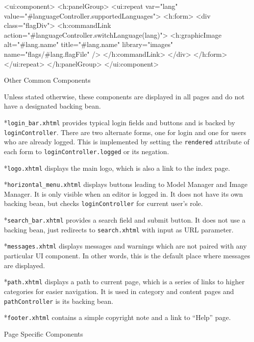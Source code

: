 \begtt

<ui:component>
  <h:panelGroup>
    <ui:repeat var="lang"
        value="#{languageController.supportedLanguages}">                    
      <h:form>
        <div class="flagDiv">
          <h:commandLink
              action="#{languageController.switchLanguage(lang)}">
            <h:graphicImage
                alt="#{lang.name}" title="#{lang.name}"
                library="images" name="flags/#{lang.flagFile}" />
          </h:commandLink>
        </div>
      </h:form>
    </ui:repeat>
  </h:panelGroup>
</ui:component>

\endtt

\secc Other Common Components

Unless stated otherwise, these components are displayed in all pages and do not have a designated backing bean.

\begitems

*{\tt login\_bar.xhtml} provides typical login fields and buttons and is backed by {\tt loginController}. There are two alternate forms, one for login and one for users who are already logged. This is implemented by setting the {\tt rendered} attribute of each form to {\tt loginController.logged} or its negation.

*{\tt logo.xhtml} displays the main logo, which is also a link to the index page.

*{\tt horizontal\_menu.xhtml} displays buttons leading to Model Manager and Image Manager. It is only visible when an editor is logged in. It does not have its own backing bean, but checks {\tt loginController} for current user’s role.

*{\tt search\_bar.xhtml} provides a search field and submit button. It does not use a backing bean, just redirects to {\tt search.xhtml} with input as URL parameter.

*{\tt messages.xhtml} displays messages and warnings which are not paired with any particular UI component. In other words, this is the default place where messages are displayed.

*{\tt path.xhtml} displays a path to current page, which is a series of links to higher categories for easier navigation. It is used in category and content pages and {\tt pathController} is its backing bean.

*{\tt footer.xhtml} contains a simple copyright note and a link to “Help” page.

\enditems

\secc Page Specific Components

